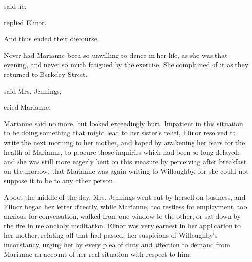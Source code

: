  said he.

 replied Elinor.


 And thus ended their discourse.

Never had Marianne been so unwilling to dance in her life, as she was that evening, and never so much fatigued by the exercise. She complained of it as they returned to Berkeley Street.

 said Mrs. Jennings, 

 cried Marianne.

 Marianne said no more, but looked exceedingly hurt. Impatient in this situation to be doing something that might lead to her sister's relief, Elinor resolved to write the next morning to her mother, and hoped by awakening her fears for the health of Marianne, to procure those inquiries which had been so long delayed; and she was still more eagerly bent on this measure by perceiving after breakfast on the morrow, that Marianne was again writing to Willoughby, for she could not suppose it to be to any other person.

About the middle of the day, Mrs. Jennings went out by herself on business, and Elinor began her letter directly, while Marianne, too restless for employment, too anxious for conversation, walked from one window to the other, or sat down by the fire in melancholy meditation. Elinor was very earnest in her application to her mother, relating all that had passed, her suspicions of Willoughby's inconstancy, urging her by every plea of duty and affection to demand from Marianne an account of her real situation with respect to him.

